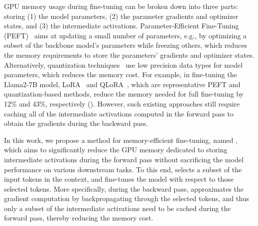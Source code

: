 GPU memory usage during fine-tuning can be broken down into three parts: 
storing (1) the model parameters, (2) the parameter gradients and optimizer states, and (3) the intermediate activations. 
Parameter-Efficient Fine-Tuning (PEFT)~\citep{DBLP:conf/icml/HoulsbyGJMLGAG19, hu_22} aims at updating a small number of parameters, 
e.g., by optimizing a subset of the backbone model's parameters while freezing others,
which reduces the memory requirements to store the parameters' gradients and optimizer states.
Alternatively, quantization techniques~\citep{dettmers_22, dettmers_23, liu_23} use low precision data types for model parameters, which reduces the memory cost.
For example, in fine-tuning the Llama2-7B model,
LoRA~\citep{hu_22} and QLoRA~\citep{dettmers_23}, which are representative PEFT and quantization-based methods,
reduce the memory needed for full fine-tuning by 12\% and 43\%, respectively ().
However, such existing approaches still require caching all of the intermediate activations computed in the forward pass
to obtain the gradients during the backward pass.







In this work, we propose a method for memory-efficient fine-tuning, named \method, 
which aims to significantly reduce the GPU memory dedicated to storing intermediate activations during the forward pass
without sacrificing the model performance on various downstream tasks.
To this end, \method selects a subset of the input tokens in the context, and fine-tunes the model with respect to those selected tokens.
More specifically, during the backward pass, \method approximates the gradient computation by backpropagating through the selected tokens, and thus 
only a subset of the intermediate activations need to be cached during the forward pass, thereby reducing the memory cost.

